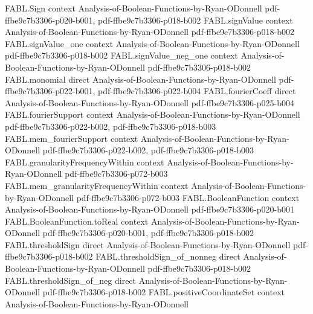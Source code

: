 \begin{theorem}
\label{FABL.agreeingVoteCount_eq_sum}
\leanok
{}
\proofstep
  {FABL.Sign}
  {context}
  {Analysis-of-Boolean-Functions-by-Ryan-ODonnell}
  {pdf-ffbe9c7b3306-p020-b001,
    pdf-ffbe9c7b3306-p018-b002}
\proofstep
  {FABL.signValue}
  {context}
  {Analysis-of-Boolean-Functions-by-Ryan-ODonnell}
  {pdf-ffbe9c7b3306-p018-b002}
\proofstep
  {FABL.signValue_one}
  {context}
  {Analysis-of-Boolean-Functions-by-Ryan-ODonnell}
  {pdf-ffbe9c7b3306-p018-b002}
\proofstep
  {FABL.signValue_neg_one}
  {context}
  {Analysis-of-Boolean-Functions-by-Ryan-ODonnell}
  {pdf-ffbe9c7b3306-p018-b002}
\proofstep
  {FABL.monomial}
  {direct}
  {Analysis-of-Boolean-Functions-by-Ryan-ODonnell}
  {pdf-ffbe9c7b3306-p022-b001,
    pdf-ffbe9c7b3306-p022-b004}
\proofstep
  {FABL.fourierCoeff}
  {direct}
  {Analysis-of-Boolean-Functions-by-Ryan-ODonnell}
  {pdf-ffbe9c7b3306-p025-b004}
\proofstep
  {FABL.fourierSupport}
  {context}
  {Analysis-of-Boolean-Functions-by-Ryan-ODonnell}
  {pdf-ffbe9c7b3306-p022-b002,
    pdf-ffbe9c7b3306-p018-b003}
\proofstep
  {FABL.mem_fourierSupport}
  {context}
  {Analysis-of-Boolean-Functions-by-Ryan-ODonnell}
  {pdf-ffbe9c7b3306-p022-b002,
    pdf-ffbe9c7b3306-p018-b003}
\proofstep
  {FABL.granularityFrequencyWithin}
  {context}
  {Analysis-of-Boolean-Functions-by-Ryan-ODonnell}
  {pdf-ffbe9c7b3306-p072-b003}
\proofstep
  {FABL.mem_granularityFrequencyWithin}
  {context}
  {Analysis-of-Boolean-Functions-by-Ryan-ODonnell}
  {pdf-ffbe9c7b3306-p072-b003}
\proofstep
  {FABL.BooleanFunction}
  {context}
  {Analysis-of-Boolean-Functions-by-Ryan-ODonnell}
  {pdf-ffbe9c7b3306-p020-b001}
\proofstep
  {FABL.BooleanFunction.toReal}
  {context}
  {Analysis-of-Boolean-Functions-by-Ryan-ODonnell}
  {pdf-ffbe9c7b3306-p020-b001,
    pdf-ffbe9c7b3306-p018-b002}
\proofstep
  {FABL.thresholdSign}
  {direct}
  {Analysis-of-Boolean-Functions-by-Ryan-ODonnell}
  {pdf-ffbe9c7b3306-p018-b002}
\proofstep
  {FABL.thresholdSign_of_nonneg}
  {direct}
  {Analysis-of-Boolean-Functions-by-Ryan-ODonnell}
  {pdf-ffbe9c7b3306-p018-b002}
\proofstep
  {FABL.thresholdSign_of_neg}
  {direct}
  {Analysis-of-Boolean-Functions-by-Ryan-ODonnell}
  {pdf-ffbe9c7b3306-p018-b002}
\proofstep
  {FABL.positiveCoordinateSet}
  {context}
  {Analysis-of-Boolean-Functions-by-Ryan-ODonnell}

\end{theorem}
